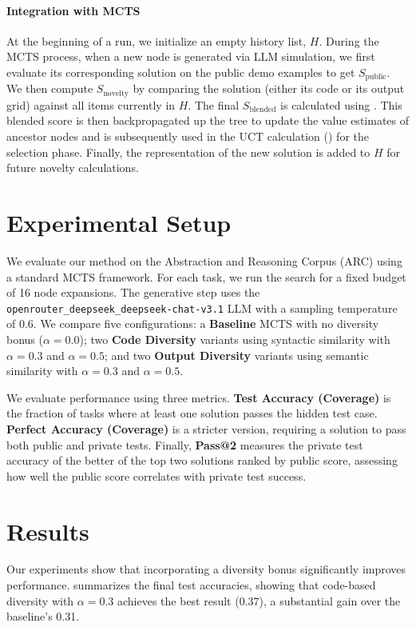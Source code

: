 \documentclass{article} %
\begin{document}
\paragraph{Integration with MCTS} At the beginning of a run, we initialize an empty history list, $H$. During the MCTS process, when a new node is generated via LLM simulation, we first evaluate its corresponding solution on the public demo examples to get $S_{\text{public}}$. We then compute $S_{\text{novelty}}$ by comparing the solution (either its code or its output grid) against all items currently in $H$. The final $S_{\text{blended}}$ is calculated using . This blended score is then backpropagated up the tree to update the value estimates of ancestor nodes and is subsequently used in the UCT calculation () for the selection phase. Finally, the representation of the new solution is added to $H$ for future novelty calculations.

\section{Experimental Setup}
\label{sec:experimental}
We evaluate our method on the Abstraction and Reasoning Corpus (ARC) using a standard MCTS framework. For each task, we run the search for a fixed budget of 16 node expansions. The generative step uses the \texttt{openrouter\_deepseek\_deepseek-chat-v3.1} LLM with a sampling temperature of 0.6. We compare five configurations: a \textbf{Baseline} MCTS with no diversity bonus ($\alpha=0.0$); two \textbf{Code Diversity} variants using syntactic similarity with $\alpha=0.3$ and $\alpha=0.5$; and two \textbf{Output Diversity} variants using semantic similarity with $\alpha=0.3$ and $\alpha=0.5$.

We evaluate performance using three metrics. \textbf{Test Accuracy (Coverage)} is the fraction of tasks where at least one solution passes the hidden test case. \textbf{Perfect Accuracy (Coverage)} is a stricter version, requiring a solution to pass both public and private tests. Finally, \textbf{Pass@2} measures the private test accuracy of the better of the top two solutions ranked by public score, assessing how well the public score correlates with private test success.

\section{Results}
\label{sec:results}
Our experiments show that incorporating a diversity bonus significantly improves performance.  summarizes the final test accuracies, showing that code-based diversity with $\alpha=0.3$ achieves the best result (0.37), a substantial gain over the baseline's 0.31.
\end{document}
